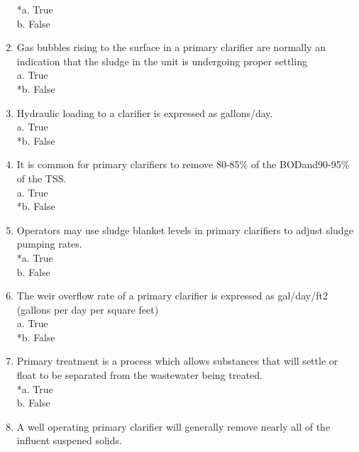 \begin{enumerate}
*a. True \\
b. False \\


\item  Gas bubbles rising to the surface in a primary clarifier are normally an indication that the sludge in the unit is undergoing proper settling \\

a. True \\
*b. False \\


\item  Hydraulic loading to a clarifier is expressed as gallons/day. \\

a. True \\
*b. False \\


\item  It is common for primary clarifiers to remove 80-85\% of the BODand90-95\% of the TSS. \\

a. True \\
*b. False \\


\item  Operators may use sludge blanket levels in primary clarifiers to adjust sludge pumping rates. \\

*a. True \\
b. False \\


\item  The weir overflow rate of a primary clarifier is expressed as gal/day/ft2 (gallons per day per square feet) \\

a. True \\
*b. False \\


\item  Primary treatment is a process which allows substances that will settle or float to be separated from the wastewater being treated. \\

*a. True \\
b. False \\


\item  A well operating primary clarifier will generally remove nearly all of the influent suspened solids. \\


\end{enumerate}
